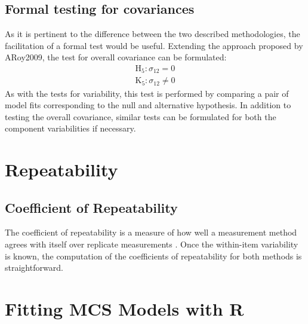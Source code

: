 \documentclass[12pt, a4paper]{report}
\theoremstyle{plain}
\theoremstyle{definition}
\theoremstyle{remark}
\begin{document}
	\section{Formal testing for covariances }
	As it is pertinent to the difference between the two described methodologies, the facilitation of a formal test would be useful. Extending the approach proposed by ARoy2009, the test for overall covariance can be formulated:
	\begin{eqnarray*}
		\operatorname{H_5} : \sigma_{12} = 0 \\
		\operatorname{K_5} : \sigma_{12} \neq 0
	\end{eqnarray*}
	As with the tests for variability, this test is performed by comparing a pair of model fits corresponding to the null and alternative hypothesis. In addition to testing the overall covariance, similar tests can be formulated for both the component variabilities if necessary.
	
	\chapter{Repeatability}
	
	\section{Coefficient of Repeatability}
	The coefficient of repeatability is a measure of how well a
	measurement method agrees with itself over replicate measurements
	\citep{BA99}. Once the within-item variability is known, the
	computation of the coefficients of repeatability for both methods
	is straightforward.
	
	
	
	\chapter{Fitting MCS Models with R}
\end{document}
